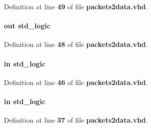 Definition at line {\bf 49} of file {\bf packets2data.\+vhd}.

\paragraph[{in\+\_\+pct\+\_\+last}]{ {\bfseries \textcolor{keywordflow}{out}\textcolor{vhdlchar}{ }} {\bfseries \textcolor{comment}{std\+\_\+logic}\textcolor{vhdlchar}{ }} \hspace{0.3cm}{\ttfamily [Port]}}\label{classpackets2data_ab6c9da964c28a4fa14bfc01c4c6abbd2}


Definition at line {\bf 48} of file {\bf packets2data.\+vhd}.

\paragraph[{in\+\_\+pct\+\_\+wrreq}]{ {\bfseries \textcolor{keywordflow}{in}\textcolor{vhdlchar}{ }} {\bfseries \textcolor{comment}{std\+\_\+logic}\textcolor{vhdlchar}{ }} \hspace{0.3cm}{\ttfamily [Port]}}\label{classpackets2data_aa37a3c50e429b14602878ef5571e1903}


Definition at line {\bf 46} of file {\bf packets2data.\+vhd}.

\paragraph[{mimo\+\_\+en}]{ {\bfseries \textcolor{keywordflow}{in}\textcolor{vhdlchar}{ }} {\bfseries \textcolor{comment}{std\+\_\+logic}\textcolor{vhdlchar}{ }} \hspace{0.3cm}{\ttfamily [Port]}}\label{classpackets2data_a0c57670aee4f9fbfa3c286573012965a}


Definition at line {\bf 37} of file {\bf packets2data.\+vhd}.

